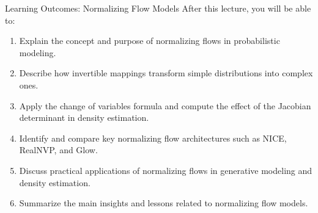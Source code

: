 \begin{frame}[allowframebreaks]{Learning Outcomes: Normalizing Flow Models}
    After this lecture, you will be able to:
    \begin{enumerate}
        \setlength{\itemsep}{-0.1em}
        \item Explain the concept and purpose of normalizing flows in probabilistic modeling.
        \item Describe how invertible mappings transform simple distributions into complex ones.
        \item Apply the change of variables formula and compute the effect of the Jacobian determinant in density estimation.
        \item Identify and compare key normalizing flow architectures such as NICE, RealNVP, and Glow.
        \item Discuss practical applications of normalizing flows in generative modeling and density estimation.
        \item Summarize the main insights and lessons related to normalizing flow models.
    \end{enumerate}
\end{frame}